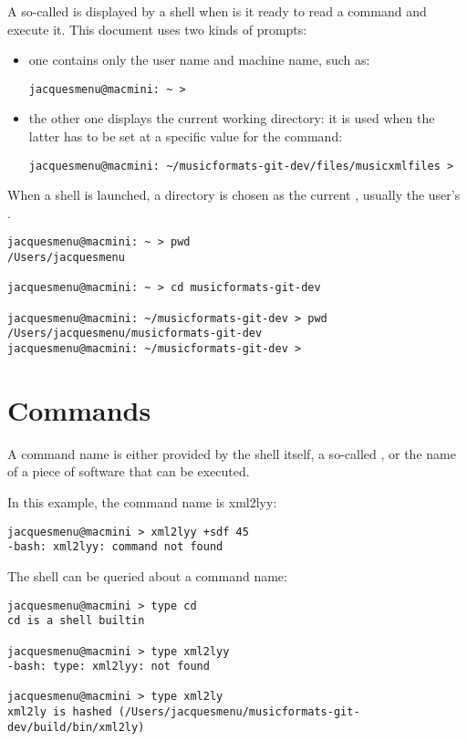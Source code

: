 A so-called  is displayed by a shell when is it ready to read a command and execute it. This document uses two kinds of prompts:
\begin{itemize}
\item one contains only the user name and machine name, such as:
\begin{lstlisting}[language=Terminal]
jacquesmenu@macmini: ~ > 
\end{lstlisting}

\item the other one displays the current working directory: it is used when the latter has to be set at a specific value for the command:
\begin{lstlisting}[language=Terminal]
jacquesmenu@macmini: ~/musicformats-git-dev/files/musicxmlfiles > 
\end{lstlisting}

\end{itemize}

When a shell is launched, a directory is chosen as the current , usually the user's .
\begin{lstlisting}[language=Terminal]
jacquesmenu@macmini: ~ > pwd
/Users/jacquesmenu

jacquesmenu@macmini: ~ > cd musicformats-git-dev

jacquesmenu@macmini: ~/musicformats-git-dev > pwd
/Users/jacquesmenu/musicformats-git-dev
jacquesmenu@macmini: ~/musicformats-git-dev >
\end{lstlisting}


\section{Commands}

A command name is either provided by the shell itself, a so-called , or the name of a piece of software that can be executed.

In this example, the command name is xml2lyy:
\begin{lstlisting}[language=Terminal]
jacquesmenu@macmini > xml2lyy +sdf 45
-bash: xml2lyy: command not found
\end{lstlisting}

The shell can be queried about a command name:
\begin{lstlisting}[language=Terminal]
jacquesmenu@macmini > type cd
cd is a shell builtin

jacquesmenu@macmini > type xml2lyy
-bash: type: xml2lyy: not found

jacquesmenu@macmini > type xml2ly
xml2ly is hashed (/Users/jacquesmenu/musicformats-git-dev/build/bin/xml2ly)
\end{lstlisting}


